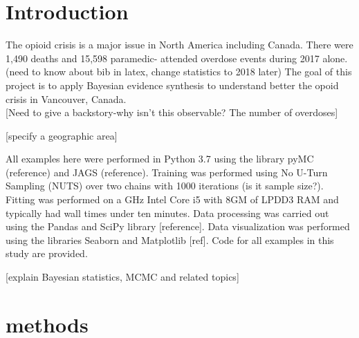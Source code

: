 \documentclass[
10pt, %
letterpaper, %
oneside, %
headinclude,footinclude, %
BCOR5mm, %
]{article}
\begin{document}
\let\thefootnote\relax{}

\let\thefootnote\relax{}


\newpage %


\section{Introduction}
The opioid crisis is a major issue in North America  including Canada. There were 1,490 deaths and 15,598 paramedic- attended overdose events during 2017 alone. \cite{Irvine:modelling} (need to know about bib in latex, change statistics to 2018 later) The goal of this project is to apply Bayesian evidence synthesis to understand better the opoid crisis in Vancouver, Canada.  \\

[Need to give a backstory-why isn't this observable? The number of overdoses] 

[specify a geographic area]

All examples here were performed in Python 3.7 using the library pyMC (reference) and JAGS (reference). Training was performed using No U-Turn Sampling (NUTS) over two chains with 1000 iterations (is it sample size?). Fitting was performed on a GHz Intel Core i5 with 8GM of LPDD3 RAM and typically had wall times under ten minutes. Data processing was carried out using the Pandas and SciPy library [reference]. Data visualization was performed using the libraries Seaborn and Matplotlib [ref]. Code for all examples in this study are provided. 

[explain Bayesian statistics, MCMC and related topics]


\section{methods}
\end{document}
